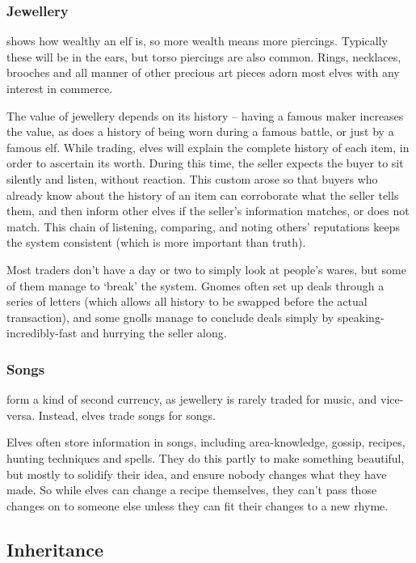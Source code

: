 \subsubsection{Jewellery}
shows how wealthy an elf is, so more wealth means more piercings.
Typically these will be in the ears, but torso piercings are also common.
Rings, necklaces, brooches and all manner of other precious art pieces adorn most elves with any interest in commerce.

The value of jewellery depends on its history -- having a famous maker increases the value, as does a history of being worn during a famous battle, or just by a famous elf.
While trading, elves will explain the complete history of each item, in order to ascertain its worth.
During this time, the seller expects the buyer to sit silently and listen, without reaction.
This custom arose so that buyers who already know about the history of an item can corroborate what the seller tells them, and then inform other elves if the seller's information matches, or does not match.
This chain of listening, comparing, and noting others' reputations keeps the system consistent (which is more important than truth).

Most traders don't have a day or two to simply look at people's wares, but some of them manage to `break' the system.
Gnomes often set up deals through a series of letters (which allows all history to be swapped before the actual transaction), and some gnolls manage to conclude deals simply by {\small speaking-incredibly-fast} and hurrying the seller along.

\subsubsection{Songs}
form a kind of second currency, as jewellery is rarely traded for music, and vice-versa.
Instead, elves trade songs for songs.

Elves often store information in songs, including area-knowledge, gossip,%
 recipes, hunting techniques and spells.%
They do this partly to make something beautiful, but mostly to solidify their idea, and ensure nobody changes what they have made.
So while elves can change a recipe themselves, they can't pass those changes on to someone else unless they can fit their changes to a new rhyme.

\subsection{Inheritance}

